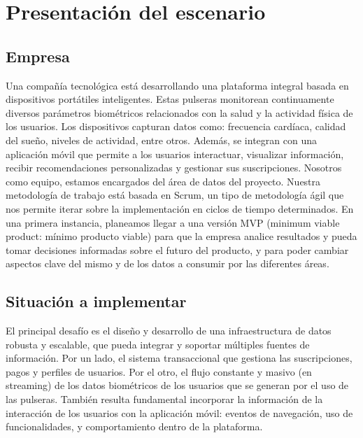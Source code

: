 \section{Presentación del escenario}
\subsection{Empresa}
Una compañía tecnológica está desarrollando una plataforma integral basada en dispositivos portátiles inteligentes. Estas pulseras monitorean continuamente diversos parámetros biométricos relacionados con la salud y la actividad física de los usuarios. 
Los dispositivos capturan datos como: frecuencia cardíaca, calidad del sueño, niveles de actividad, entre otros. Además, se integran con una aplicación móvil que permite a los usuarios interactuar, visualizar información, recibir recomendaciones personalizadas y gestionar sus suscripciones.
Nosotros como equipo, estamos encargados del área de datos del proyecto. Nuestra metodología de trabajo está basada en Scrum, un tipo de metodología ágil que nos permite iterar sobre la implementación en ciclos de tiempo determinados. En una primera instancia, planeamos llegar a una versión MVP (minimum viable product: mínimo producto viable) para que la empresa analice resultados y pueda tomar decisiones informadas sobre el futuro del producto, y para poder cambiar aspectos clave del mismo y de los datos a consumir por las diferentes áreas.
\subsection{Situación a implementar}
El principal desafío es el diseño y desarrollo de una infraestructura de datos robusta y escalable, que pueda integrar y soportar múltiples fuentes de información. Por un lado, el sistema transaccional que gestiona las suscripciones, pagos y perfiles de usuarios. Por el otro, el flujo constante y masivo (en streaming) de los datos biométricos de los usuarios que se generan por el uso de las pulseras. También resulta fundamental incorporar la información de la interacción de los usuarios con la aplicación móvil: eventos de navegación, uso de funcionalidades, y comportamiento dentro de la plataforma.
